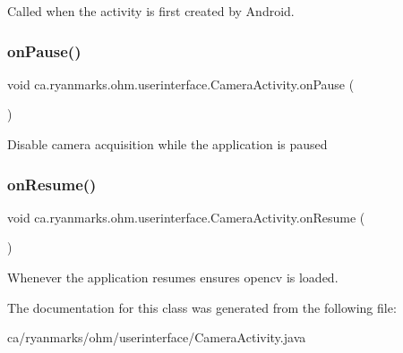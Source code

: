 Called when the activity is first created by Android. \hypertarget{classca_1_1ryanmarks_1_1ohm_1_1userinterface_1_1_camera_activity_a34efe943c0d3769ad9b9f9866974836f}{}\label{classca_1_1ryanmarks_1_1ohm_1_1userinterface_1_1_camera_activity_a34efe943c0d3769ad9b9f9866974836f} 
\subsubsection{\texorpdfstring{on\+Pause()}{onPause()}}
{\footnotesize\ttfamily void ca.\+ryanmarks.\+ohm.\+userinterface.\+Camera\+Activity.\+on\+Pause (\begin{DoxyParamCaption}{ }\end{DoxyParamCaption})}

Disable camera acquisition while the application is paused \hypertarget{classca_1_1ryanmarks_1_1ohm_1_1userinterface_1_1_camera_activity_a9178d308984ee4f944f051adc205373d}{}\label{classca_1_1ryanmarks_1_1ohm_1_1userinterface_1_1_camera_activity_a9178d308984ee4f944f051adc205373d} 
\subsubsection{\texorpdfstring{on\+Resume()}{onResume()}}
{\footnotesize\ttfamily void ca.\+ryanmarks.\+ohm.\+userinterface.\+Camera\+Activity.\+on\+Resume (\begin{DoxyParamCaption}{ }\end{DoxyParamCaption})}

Whenever the application resumes ensures opencv is loaded. 

The documentation for this class was generated from the following file\+:\begin{DoxyCompactItemize}
\item 
ca/ryanmarks/ohm/userinterface/Camera\+Activity.\+java\end{DoxyCompactItemize}
